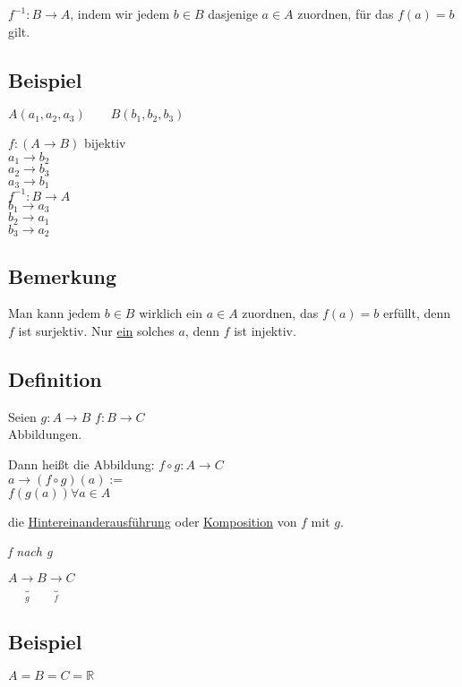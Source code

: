 \documentclass[a4paper, 12pt, twoside] {article}
\begin{document}
$f^{-1} \colon B \rightarrow A$, indem wir jedem $b \in B$ dasjenige $a \in A$ zuordnen, für das $f(a) = b$ gilt.

\subsection{Beispiel} %
$A (a_1, a_2, a_3) \qquad B (b_1, b_2, b_3)$

$f \colon (A \rightarrow B)$ bijektiv \\
$a_1 \rightarrow b_2$ \\
$a_2 \rightarrow b_3$ \\
$a_3 \rightarrow b_1$ \\

$f^{-1} \colon B \rightarrow A$ \\
$b_1 \rightarrow a_3$ \\
$b_2 \rightarrow a_1$ \\
$b_3 \rightarrow a_2$ \\

\subsection{Bemerkung} %
Man kann jedem $b \in B$ wirklich ein $a \in A$ zuordnen, das $f(a) = b$ erfüllt, denn $f$ ist surjektiv. Nur \underline{ein} solches $a$, denn $f$ ist injektiv.

\subsection[Definition (Hintereinanderausführung/Komposition)]{Definition} %
Seien $g \colon A \rightarrow B$ \qquad $f \colon B \rightarrow C$ \\
Abbildungen.

Dann heißt die Abbildung:
$f \circ g \colon A \rightarrow C$ \\
$a \rightarrow (f \circ g) (a):=$ \\
$f(g(a)) \forall a \in A$

die \underline{Hintereinanderausführung} oder \underline{Komposition} von $f$ mit $g$.

\textit{f nach g}

$A \underbrace{\rightarrow}_{g} B \underbrace{\rightarrow}_{f} C$ %

\subsection{Beispiel} %
$A = B = C = \mathbb{R}$
\end{document}
